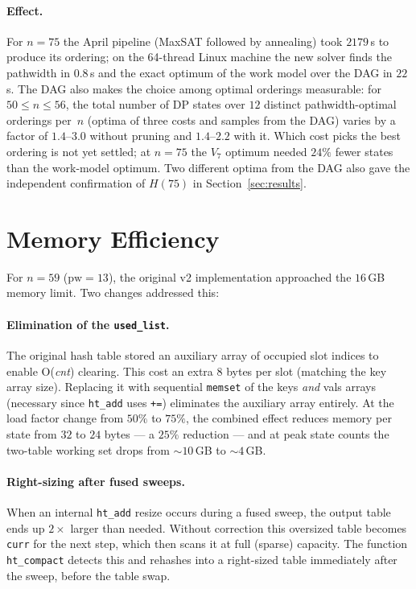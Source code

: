 \documentclass[12pt]{article}
\theoremstyle{definition}
\newcommand{\pw}{\mathrm{pw}}
\begin{document}
\paragraph{Effect.}
For $n=75$ the April pipeline (MaxSAT followed by annealing) took
$2179$\,s to produce its ordering; on the 64-thread Linux machine the new
solver finds the pathwidth in $0.8$\,s and the exact optimum of the work model
over the DAG in $22$\,s.
The DAG also makes the choice among optimal orderings measurable: for
$50\le n\le56$, the total number of DP states over $12$ distinct pathwidth-optimal
orderings per~$n$ (optima of three costs and samples from the DAG) varies
by a factor of $1.4$--$3.0$ without pruning and $1.4$--$2.2$ with it.
Which cost picks the best ordering is not yet settled; at $n=75$ the $V_7$
optimum needed $24\%$ fewer states than the work-model optimum.
Two different optima from the DAG also gave the independent confirmation of
$H(75)$ in Section~\ref{sec:results}.

\section{Memory Efficiency}
\label{sec:memory}

For $n = 59$ ($\pw = 13$), the original v2 implementation approached the
$16$\,GB memory limit.
Two changes addressed this:

\paragraph{Elimination of the \texttt{used\_list}.}
The original hash table stored an auxiliary array of occupied slot indices to
enable O(\textit{cnt}) clearing.
This cost an extra $8$ bytes per slot (matching the key array size).
Replacing it with sequential \texttt{memset} of the keys \emph{and} vals
arrays (necessary since \texttt{ht\_add} uses \texttt{+=}) eliminates the
auxiliary array entirely.
At the load factor change from $50\%$ to $75\%$, the combined effect reduces
memory per state from $32$ to $24$ bytes — a $25\%$ reduction — and at peak
state counts the two-table working set drops from $\sim\!10$\,GB to
$\sim\!4$\,GB.

\paragraph{Right-sizing after fused sweeps.}
When an internal \texttt{ht\_add} resize occurs during a fused sweep, the
output table ends up $2\times$ larger than needed.
Without correction this oversized table becomes \texttt{curr} for the next
step, which then scans it at full (sparse) capacity.
The function \texttt{ht\_compact} detects this and rehashes into a right-sized
table immediately after the sweep, before the table swap.
\end{document}
